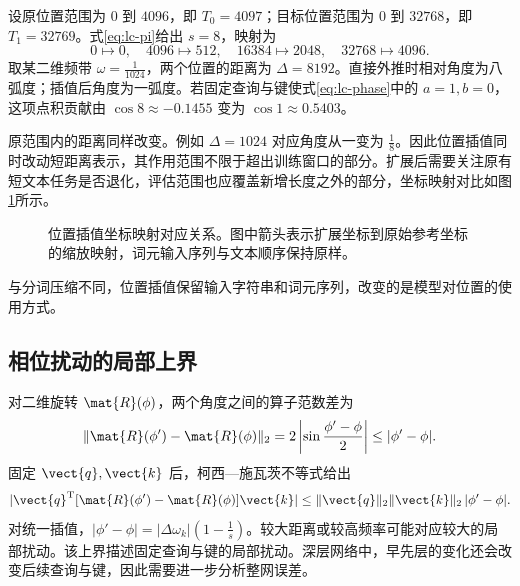 \documentclass[../textbook.tex]{subfiles}
\begin{document}
\begin{example}[位置插值对分数的影响]
设原位置范围为 $0$ 到 $4096$，即 $T_0=4097$；目标位置范围为 $0$ 到 $32768$，即 $T_1=32769$。式\eqref{eq:lc-pi}给出 $s=8$，映射为
\begin{equation*}
 0\mapsto0,\quad4096\mapsto512,\quad
 16384\mapsto2048,\quad32768\mapsto4096.
\end{equation*}
取某二维频带 $\omega=\frac{1}{1024}$，两个位置的距离为 $\Delta=8192$。直接外推时相对角度为八弧度；插值后角度为一弧度。若固定查询与键使式\eqref{eq:lc-phase}中的 $a=1,b=0$，这项点积贡献由 $\cos8\approx-0.1455$ 变为 $\cos1\approx0.5403$。

原范围内的距离同样改变。例如 $\Delta=1024$ 对应角度从一变为 $\frac{1}{8}$。因此位置插值同时改动短距离表示，其作用范围不限于超出训练窗口的部分。扩展后需要关注原有短文本任务是否退化，评估范围也应覆盖新增长度之外的部分，坐标映射对比如图\ref{fig:lc-interpolation}所示。

\begin{figure}[htbp]
\centering
{}
\caption[位置插值坐标映射对应关系]{位置插值坐标映射对应关系。图中箭头表示扩展坐标到原始参考坐标的缩放映射，词元输入序列与文本顺序保持原样。}\label{fig:lc-interpolation}
\end{figure}
与分词压缩不同，位置插值保留输入字符串和词元序列，改变的是模型对位置的使用方式。
\end{example}

\subsection{相位扰动的局部上界}
对二维旋转 $\mat{R}(\phi)$，两个角度之间的算子范数差为
\begin{equation}
 \|\mat{R}(\phi')-\mat{R}(\phi)\|_2
 =2\left|\sin\frac{\phi'-\phi}{2}\right|
 \le|\phi'-\phi|.
\end{equation}
固定 $\vect{q},\vect{k}$ 后，柯西—施瓦茨不等式给出
\begin{equation}
 |\vect{q}^{\mathrm{T}}[\mat{R}(\phi')-\mat{R}(\phi)]\vect{k}|
 \le\|\vect{q}\|_2\|\vect{k}\|_2\,|\phi'-\phi|.
\end{equation}
对统一插值，$|\phi'-\phi|=|\Delta\omega_k|(1-\frac{1}{s})$。较大距离或较高频率可能对应较大的局部扰动。该上界描述固定查询与键的局部扰动。深层网络中，早先层的变化还会改变后续查询与键，因此需要进一步分析整网误差。
\end{document}
